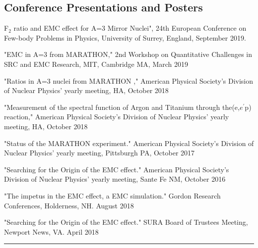\documentclass[12pt,letterpaper]{article}
\begin{document}
\subsection*{Conference Presentations and Posters}
\begin{itemize*}
	\item F$_2$ ratio and EMC effect for A=3 Mirror Nuclei", 24th European Conference on Few-body Problems in Physics, University of Surrey, England, September 2019.
	\item "EMC in A=3 from MARATHON," 2nd Workshop on Quantitative Challenges in SRC and EMC Research,  MIT, Cambridge MA,  March 2019
	\item "Ratios in A=3 nuclei from MARATHON ," American Physical Society's Division of Nuclear Physics' yearly meeting, HA, October 2018
	\item "Measurement of the spectral function of Argon and Titanium through the(e,$e^\prime$p) reaction," American Physical Society's Division of Nuclear Physics' yearly meeting, HA, October 2018
	\item "Status of the MARATHON experiment." American Physical Society's Division of Nuclear Physics' yearly meeting, Pittsburgh PA, October 2017
	\item "Searching for the Origin of the EMC effect." American Physical Society's Division of Nuclear Physics' yearly meeting, Sante Fe NM, October 2016

	\item "The impetus in the EMC effect, a EMC simulation." Gordon Research Conferences, Holderness, NH. August 2018 
	\item "Searching for the Origin of the EMC effect." SURA Board of Trustees Meeting, Newport News, VA. April 2018 
\end{itemize*}
\iffalse
\hrule
\end{document}
